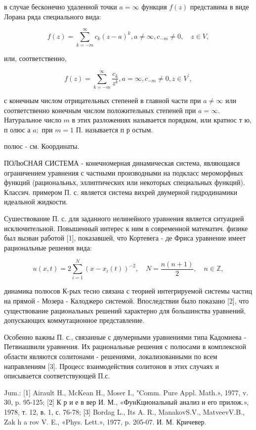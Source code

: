 \documentclass[10pt]{article}
\begin{document}
в случае бесконечно удаленной точки $a=\infty$ функция $f(z)$ представима в виде Лорана ряда специального вида:



\[

f(z)=\sum_{k=-m}^{\infty} c_{k}(z-a)^{k}, a \neq \infty, c_{-m} \neq 0, \quad z \in V,

\]



или, соответственно,



\[

f(z)=\sum_{k=-m}^{\infty} \frac{c_{k}}{z^{k}}, a=\infty, c_{-m} \neq 0, z \in V^{\prime},

\]



с конечным числом отрицательных степеней в главной части при $a \neq \infty$ или соответственно конечным числом положительных степеней при $a=\infty$. Натуральное число $m$ в этих разложениях называется порядком, или кратнос т ю, п олюс а $a ;$ при $m=1$ П. называется п р остым.



полюс - см. Координаты.



ПОЛюСНАЯ СИСТЕМА - конечномерная динамическая система, являющаяся ограничением уравнения с частными производными на подкласс мероморфных функций (рациональньх, эллиптических или некоторых специальных функций). Классич. примером П. с. является система вихрей двумерной гидродинамики идеальной жидкости.



Сушествование П. с. для заданного нелинейного уравнения является ситуацией исключительной. Повышенный интерес к ним в современной математич. физике был вызван работой [1], показавшей, что Кортевега - де Фриса уравнение имеет рациональные решения вида:



\[

u(x, t)=2 \sum_{i=1}^{N}\left(x-x_{i}(t)\right)^{-2}, \quad N=\frac{n(n+1)}{2}, \quad n \in \mathbb{Z},

\]



динамика полюсов К-рых тесно связана с теорией интегрируемой системы частиц на прямой - Мозера - Калоджеро системой. Впоследствии было показано [2], что существование рациональных решений характерно для большинства уравнений, допускающих коммутационное представление.



Особенно важны П. с., связанные с двумерными уравнениями типа Кадомиева - Петвиашвили уравнения. Их рациональные решения с полюсами в комплексной области являются солитонами - решениями, локализованными по всем направлениям [3]. Процесс взаимодействия солитонов в этих случаях и описывается соответствующей П.с.



Jum.: [1] Airault H., McKean H., Moser I., "Comm. Pure Appl. Math.», 1977, v. 30, p. 95-125; [2] К р и е в вер И. М., «ФунКциональный анализ и его прилож.», 1978, т. 12, в. 1, с. 76-78; [3] Bordag L., Its A. R., ManakovS.V., MatveevV.B., Zak h a rov V. E., «Phys. Lett.», 1977, p. 205-07. И. М. Кричевер.
\end{document}
